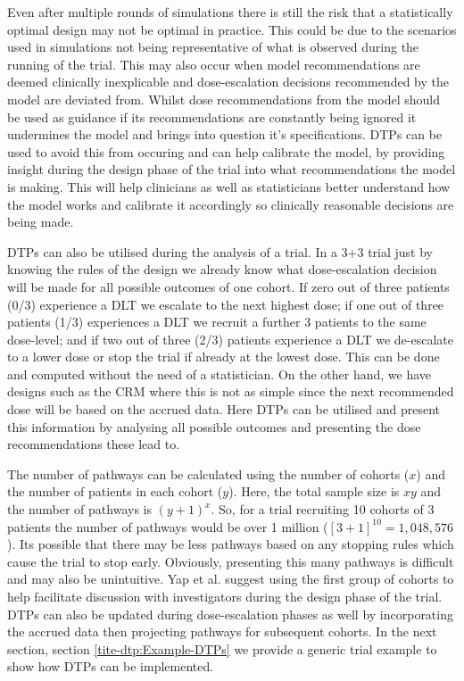 Even after multiple rounds of simulations there is still the risk that a statistically optimal design may not be optimal in practice. This could be due to the scenarios used in simulations not being representative of what is observed during the running of the trial. This may also occur when model recommendations are deemed clinically inexplicable and dose-escalation decisions recommended by the model are deviated from. Whilst dose recommendations from the model should be used as guidance if its recommendations are constantly being ignored it undermines the model and brings into question it's specifications. DTPs can be used to avoid this from occuring and can help calibrate the model, by providing insight during the design phase of the trial into what recommendations the model is making. This will help clinicians as well as statisticians better understand how the model works and calibrate it accordingly so clinically reasonable decisions are being made.   

DTPs can also be utilised during the analysis of a trial. In a 3+3 trial just by knowing the rules of the design we already know what dose-escalation decision will be made for all possible outcomes of one cohort. If zero out of three patients (0/3) experience a DLT we escalate to the next highest dose; if one out of three patients (1/3) experiences a DLT we recruit a further 3 patients to the same dose-level; and if two out of three (2/3) patients experience a DLT we de-escalate to a lower dose or stop the trial if already at the lowest dose. This can be done and computed without the need of a statistician. On the other hand, we have designs such as the CRM where this is not as simple since the next recommended dose will be based on the accrued data. Here DTPs can be utilised and present this information by analysing all possible outcomes and presenting the dose recommendations these lead to.

The number of pathways can be calculated using the number of cohorts ($x$) and the number of patients in each cohort ($y$). Here, the total sample size is $xy$ and the number of pathways is $(y+1)^x$. So, for a trial recruiting 10 cohorts of 3 patients the number of pathways would be over 1 million ($[3+1]^{10} = 1,048,576$). Its possible that there may be less pathways based on any stopping rules which cause the trial to stop early. Obviously, presenting this many pathways is difficult and may also be unintuitive. Yap et al. \cite{yapDoseTransitionPathways2017} suggest using the first group of cohorts to help facilitate discussion with investigators during the design phase of the trial. DTPs can also be updated during dose-escalation phases as well by incorporating the accrued data then projecting pathways for subsequent cohorts. In the next section, section \ref{tite-dtp:Example-DTPs} we provide a generic trial example to show how DTPs can be implemented.  

